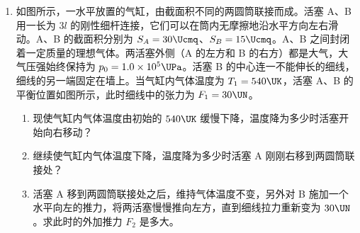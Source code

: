 \documentclass[\gkver]{gaokaozhenti}
\begin{document}
\begin{enumerate}
{（1）从初始至两棒达到速度相同的过程中，两棒总动量守恒，有

$mv_{0}=2mv$   ①

根据能量守恒，整个过程中产生的总热量

$Q=\frac{1}{2}mv_{0}^{2}-\frac{1}{2}(2m)v^{2}=\frac{1}{4}mv_{0}^{2}$   ②

（2）设 ab 棒的速度变为初速度的 $\frac{3}{4}$ 时，cd 棒的速度为 $v'$，则由动量守恒可知

$mv_{0}=m\cdot\frac{3}{4}v_{0}+mv'$   ③

此时回路中的感应电动势和感应电流分别为

$\varepsilon=(\frac{3}{4}v_{0}-v')Bl$   ④

$I=\frac{\varepsilon}{2R}$   ⑤

此时 cd 棒所受的安培力

$F=IBl$   ⑥

cd 棒的加速度

$a=\frac{F}{m}$   ⑦

由以上各式，可得

$a=\frac{B^{2}l^{2}v_{0}}{4mR}$   ⑧

评分标准：本题 12 分。第（1）问 6 分，其中①、②各 3 分。第（2）问 6 分，其中③式 1 分，④式 2 分，⑤式 1 分，⑧式 2 分。
}

\item
如图所示，一水平放置的气缸，由截面积不同的两圆筒联接而成。活塞 A、B 用一长为 $3l$ 的刚性细杆连接，它们可以在筒内无摩擦地沿水平方向左右滑动。A、B 的截面积分别为 $S_{A}=30\Ucmq$、$S_{B}=15\Ucmq$。A、B 之间封闭着一定质量的理想气体。两活塞外侧（A 的左方和 B 的右方）都是大气，大气压强始终保持为 $p_{0}=1.0\times10^{5}\UPa$。活塞 B 的中心连一不能伸长的细线，细线的另一端固定在墙上。当气缸内气体温度为 $T_{1}=540\UK$，活塞 A、B 的平衡位置如图所示，此时细线中的张力为 $F_{1}=30\UN$。
\begin{enumerate}
	\item
	现使气缸内气体温度由初始的 $540\UK$ 缓慢下降，温度降为多少时活塞开始向右移动？
	\item
	继续使气缸内气体温度下降，温度降为多少时活塞 A 刚刚右移到两圆筒联接处？
	\item
	活塞 A 移到两圆筒联接处之后，维持气体温度不变，另外对 B 施加一个水平向左的推力，将两活塞慢慢推向左方，直到细线拉力重新变为 $30\UN$。求此时的外加推力 $F_{2}$ 是多大。
\end{enumerate}


\end{enumerate}
\end{document}
